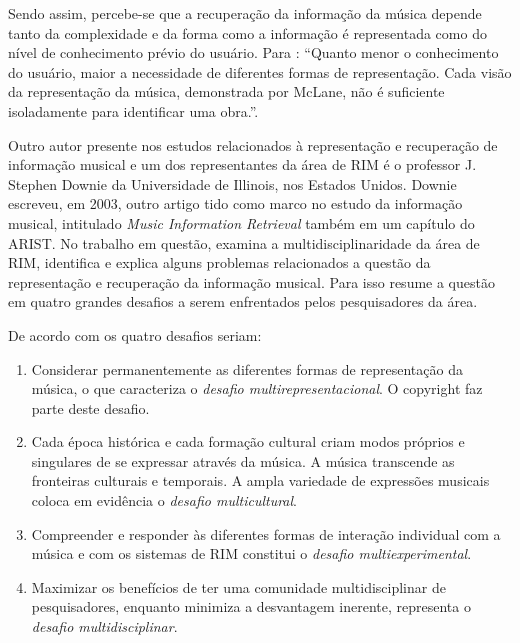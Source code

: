 Sendo assim, percebe-se que a recuperação da informação da música depende tanto da complexidade e da forma como a informação é representada como do nível de conhecimento prévio do usuário. Para : “Quanto menor o conhecimento do usuário, maior a necessidade de diferentes formas de representação. Cada visão da representação da música, demonstrada por McLane, não é suficiente isoladamente para identificar uma obra.”.

Outro autor presente nos estudos relacionados à representação e recuperação de informação musical e um dos representantes da área de RIM é o professor J. Stephen Downie da Universidade de Illinois, nos Estados Unidos. Downie escreveu, em 2003, outro artigo tido como marco no estudo da informação musical, intitulado \textit{Music Information Retrieval} também em um capítulo do ARIST. No trabalho em questão,  examina a multidisciplinaridade da área de RIM, identifica e explica alguns problemas relacionados a questão da representação e recuperação da informação musical. Para isso  resume a questão em quatro grandes desafios a serem enfrentados pelos pesquisadores da área.

De acordo com  os quatro desafios seriam:

\begin{citacao}
    \begin{enumerate}
        \item Considerar permanentemente as diferentes formas de representação da música, o que caracteriza o \textit{desafio multirepresentacional}. O copyright faz parte deste desafio.
        \item Cada época histórica e cada formação cultural criam modos próprios e singulares de se expressar através da música. A música transcende as fronteiras culturais e temporais. A ampla variedade de expressões musicais coloca em evidência o \textit{desafio multicultural}.
        \item Compreender e responder às diferentes formas de interação individual com a música e com os sistemas de RIM constitui o \textit{desafio multiexperimental}.
        \item Maximizar os benefícios de ter uma comunidade multidisciplinar de pesquisadores, enquanto minimiza a desvantagem inerente, representa o \textit{desafio multidisciplinar}.
    \end{enumerate} 
\end{citacao}

